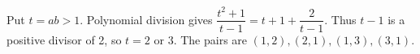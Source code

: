 Put $ t=ab>1 $. Polynomial division gives $\dfrac{t^2+1}{t-1}=t+1+\dfrac{2}{t-1}$. Thus $ t-1 $ is a positive divisor of 2, so $ t=2 $ or 3. The pairs are $\boxed{(1,2),(2,1),(1,3),(3,1)}$.
